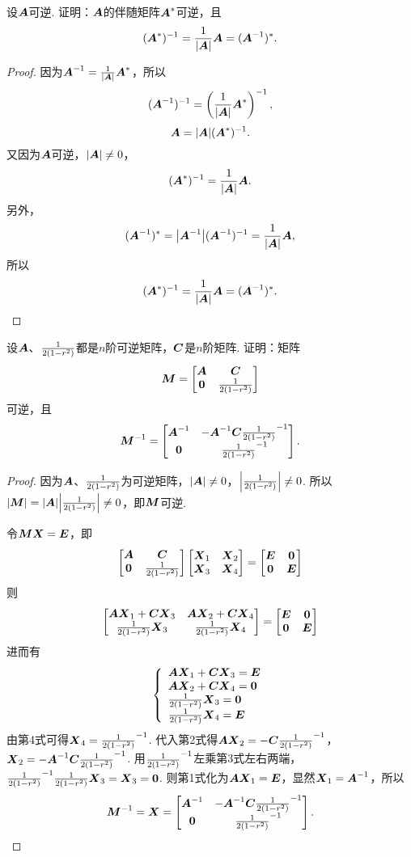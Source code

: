 \begin{example}
设\(\A\)可逆.
证明：\(\A\)的伴随矩阵\(\A^*\)可逆，且\[
(\A^*)^{-1}=\frac{1}{\abs{\A}}\A=(\A^{-1})^*.
\]
\begin{proof}
因为\(\A^{-1}=\frac{1}{\abs{\A}} \A^*\)，所以\[
(\A^{-1})^{-1} = \left( \frac{1}{\abs{\A}} \A^* \right)^{-1},
\]\[
\A = \abs{\A} (\A^*)^{-1}.
\]又因为\(\A\)可逆，\(\abs{\A}\neq0\)，\[
(\A^*)^{-1} = \frac{1}{\abs{\A}} \A.
\]另外，\[
(\A^{-1})^* = \abs{\A^{-1}} (\A^{-1})^{-1}
= \frac{1}{\abs{\A}} \A,
\]所以\[
(\A^*)^{-1}=\frac{1}{\abs{\A}}\A=(\A^{-1})^*.
\qedhere
\]
\end{proof}
\end{example}

\begin{example}
设\(\A\)、\(\B\)都是\(n\)阶可逆矩阵，\(\C\)是\(n\)阶矩阵.
证明：矩阵\[
\mat{M} = \begin{bmatrix}
\A & \C \\
\z & \B
\end{bmatrix}
\]可逆，且\[
\mat{M}^{-1} = \begin{bmatrix}
\A^{-1} & -\A^{-1} \C \B^{-1} \\
\z & \B^{-1}
\end{bmatrix}.
\]
\begin{proof}
因为\(\A\)、\(\B\)为可逆矩阵，\(\abs{\A} \neq 0\)，\(\abs{\B} \neq 0\).
所以\(\abs{\mat{M}}=\abs{\A}\abs{\B} \neq 0\)，即\(\mat{M}\)可逆.

令\(\mat{M}\x=\E\)，即\[
\begin{bmatrix}
\A & \C \\
\z & \B
\end{bmatrix}\begin{bmatrix}
\x_1 & \x_2 \\
\x_3 & \x_4
\end{bmatrix} = \begin{bmatrix}
\E & \z \\
\z & \E
\end{bmatrix}
\]则\[
\begin{bmatrix}
\A\x_1+\C\x_3 & \A\x_2+\C\x_4 \\
\B\x_3 & \B\x_4
\end{bmatrix} = \begin{bmatrix}
\E & \z \\
\z & \E
\end{bmatrix}
\]进而有\[
\left\{ \begin{array}{l}
\A\x_1+\C\x_3 = \E \\
\A\x_2+\C\x_4 = \z \\
\B\x_3 = \z \\
\B\x_4 = \E
\end{array} \right.
\]
由第4式可得\(\x_4 = \B^{-1}\).
代入第2式得\(\A\x_2=-\C\B^{-1}\)，%
\(\x_2=-\A^{-1}\C\B^{-1}\).
用\(\B^{-1}\)左乘第3式左右两端，\(\B^{-1}\B\x_3=\x_3=\z\).
则第1式化为\(\A\x_1=\E\)，显然\(\x_1=\A^{-1}\)，所以\[
\mat{M}^{-1} = \x = \begin{bmatrix}
\A^{-1} & -\A^{-1}\C\B^{-1} \\
\z & \B^{-1}
\end{bmatrix}.
\qedhere
\]
\end{proof}
\end{example}


